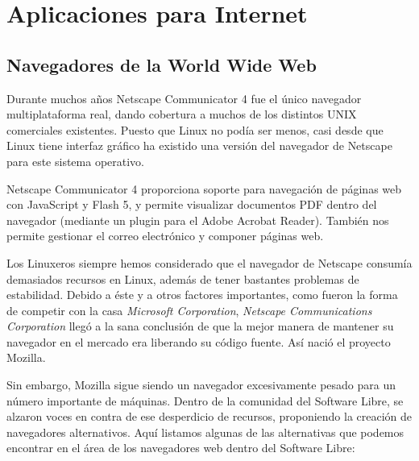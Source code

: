 
\chapter{Aplicaciones para Internet}
\label{internet.tex}


\section{Navegadores de la World Wide Web}

Durante  muchos  años  {\sf  Netscape Communicator  4}  fue  el  único
navegador  multiplataforma  real,  dando  cobertura a  muchos  de  los
distintos UNIX comerciales  existentes. Puesto que Linux  no podía ser
menos, casi  desde que  Linux tiene interfaz  gráfico ha  existido una
versión del navegador de {\sf Netscape} para este sistema operativo.

{\sf Netscape  Communicator 4} proporciona soporte  para navegación de
páginas web con {\sf JavaScript} y {\sf Flash 5}, y permite visualizar
documentos PDF dentro  del navegador (mediante un plugin  para el {\sf
Adobe  Acrobat  Reader}).  También  nos permite  gestionar  el  correo
electrónico y componer páginas web.

Los  Linuxeros siempre  hemos  considerado que  el  navegador de  {\sf
Netscape}  consumía  demasiados recursos  en  Linux,  además de  tener
bastantes problemas de  estabilidad. Debido a éste y  a otros factores
importantes,  como  fueron la  forma  de  competir  con la  casa  {\em
Microsoft  Corporation},  {\em  Netscape  Communications  Corporation}
llegó  a la  sana conclusión  de que  la mejor  manera de  mantener su
navegador en el  mercado era liberando su código fuente.  Así nació el
proyecto {\sf Mozilla}.

Sin  embargo, {\sf  Mozilla} sigue  siendo un  navegador excesivamente
pesado para un  número importante de máquinas. Dentro  de la comunidad
del Software Libre,  se alzaron voces en contra de  ese desperdicio de
recursos, proponiendo  la creación  de navegadores  alternativos. Aquí
listamos algunas de las alternativas  que podemos encontrar en el área
de los navegadores web dentro del Software Libre:

